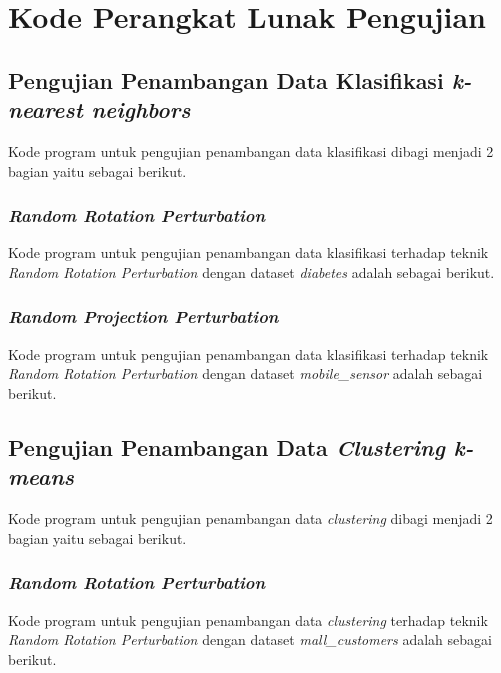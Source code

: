 \chapter{Kode Perangkat Lunak Pengujian}
\label{lamp:B}

\section{Pengujian Penambangan Data Klasifikasi \textit{k-nearest neighbors}}
\label{sec:pengujian-knn}

Kode program untuk pengujian penambangan data klasifikasi dibagi menjadi 2 bagian yaitu sebagai berikut.

\subsection{\textit{Random Rotation Perturbation}}
\label{subsec:knn-rotation-perturbation}
Kode program untuk pengujian penambangan data klasifikasi terhadap teknik \textit{Random Rotation Perturbation} dengan dataset \textit{diabetes} adalah sebagai berikut.


\subsection{\textit{Random Projection Perturbation}}
\label{subsec:knn-projection-perturbation}
Kode program untuk pengujian penambangan data klasifikasi terhadap teknik \textit{Random Rotation Perturbation} dengan dataset \textit{mobile\_sensor} adalah sebagai berikut.


\section{Pengujian Penambangan Data \textit{Clustering k-means}}
\label{sec:pengujian-kmeans}

Kode program untuk pengujian penambangan data \textit{clustering} dibagi menjadi 2 bagian yaitu sebagai berikut.

\subsection{\textit{Random Rotation Perturbation}}
\label{subsec:kmeans-rotation-perturbation}
Kode program untuk pengujian penambangan data \textit{clustering} terhadap teknik \textit{Random Rotation Perturbation} dengan dataset \textit{mall\_customers} adalah sebagai berikut.


